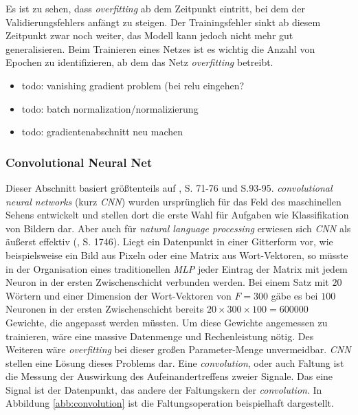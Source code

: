 \documentclass[a4paper,11pt]{article}
\begin{document}
Es ist zu sehen, dass \textit{overfitting} ab dem Zeitpunkt eintritt, bei dem der Validierungsfehlers anfängt zu steigen. Der Trainingsfehler sinkt ab diesem Zeitpunkt zwar noch weiter, das Modell kann jedoch nicht mehr gut generalisieren. Beim Trainieren eines Netzes ist es wichtig die Anzahl von Epochen zu identifizieren, ab dem das Netz \textit{overfitting} betreibt.

\begin{itemize}
    \item todo:  vanishing gradient problem (bei relu eingehen?
    \item todo: batch normalization/normalizierung
    \item todo: gradientenabschnitt neu machen
\end{itemize}{}

\subsubsection{Convolutional Neural Net} \label{kap:CNN}

Dieser Abschnitt basiert größtenteils auf \cite{deepEssentials}, S. 71-76 und S.93-95.
\textit{convolutional neural networks} (kurz \textit{CNN}) wurden ursprünglich für das Feld des maschinellen Sehens entwickelt und stellen dort die erste Wahl für Aufgaben wie Klassifikation von Bildern dar. Aber auch für \textit{natural language processing} erwiesen sich \textit{CNN} als äußerst effektiv (\cite{cnnSentence}, S. 1746). Liegt ein Datenpunkt in einer Gitterform vor, wie beispielsweise ein Bild aus Pixeln oder eine Matrix aus Wort-Vektoren, so müsste in der Organisation eines traditionellen \textit{MLP} jeder Eintrag der Matrix mit jedem Neuron in der ersten Zwischenschicht verbunden werden. Bei einem Satz mit $20$ Wörtern und einer Dimension der Wort-Vektoren von $F = 300$ gäbe es bei $100$ Neuronen in der ersten Zwischenschicht bereits $20 \times 300 \times 100  = 600000$ Gewichte, die angepasst werden müssten. Um diese Gewichte angemessen zu trainieren, wäre eine massive Datenmenge und Rechenleistung nötig. Des Weiteren wäre \textit{overfitting} bei dieser großen Parameter-Menge unvermeidbar. \textit{CNN} stellen eine Lösung dieses Problems dar. Eine \textit{convolution}, oder auch Faltung ist die Messung der Auswirkung des Aufeinandertreffens zweier Signale. Das eine Signal ist der Datenpunkt, das andere der Faltungskern der \textit{convolution}. In Abbildung \ref{abb:convolution} ist die Faltungsoperation beispielhaft dargestellt.
\end{document}
